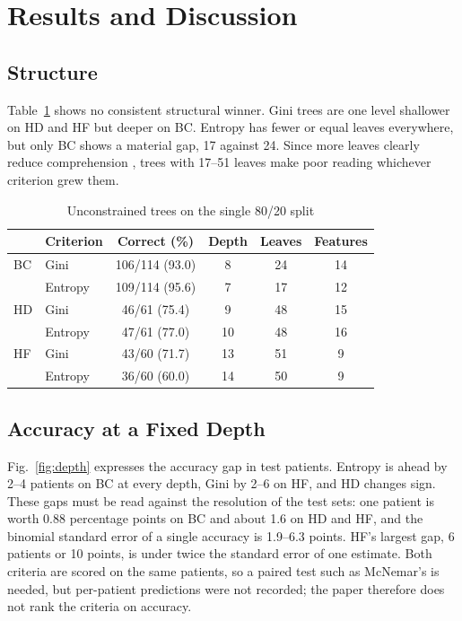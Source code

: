 \documentclass[conference,10pt]{IEEEtran}
\begin{document}
\section{Results and Discussion}
\subsection{Structure}
Table~\ref{tab:struct} shows no consistent structural winner. Gini trees are one level shallower on HD and HF but deeper on BC. Entropy has fewer or equal leaves everywhere, but only BC shows a material gap, 17 against 24. Since more leaves clearly reduce comprehension \cite{piltaver2016}, trees with 17--51 leaves make poor reading whichever criterion grew them.

\begin{table}[!t]
\caption{Unconstrained trees on the single 80/20 split}
\label{tab:struct}
\centering
\footnotesize
\begin{tabular}{@{}l l c c c c@{}}
\hline
 & Criterion & Correct (\%) & Depth & Leaves & Features \\
\hline
BC & Gini & 106/114 (93.0) & 8 & 24 & 14 \\
   & Entropy & 109/114 (95.6) & 7 & 17 & 12 \\
HD & Gini & 46/61 (75.4) & 9 & 48 & 15 \\
   & Entropy & 47/61 (77.0) & 10 & 48 & 16 \\
HF & Gini & 43/60 (71.7) & 13 & 51 & 9 \\
   & Entropy & 36/60 (60.0) & 14 & 50 & 9 \\
\hline
\end{tabular}
\end{table}

\subsection{Accuracy at a Fixed Depth}
Fig.~\ref{fig:depth} expresses the accuracy gap in test patients. Entropy is ahead by 2--4 patients on BC at every depth, Gini by 2--6 on HF, and HD changes sign. These gaps must be read against the resolution of the test sets: one patient is worth 0.88 percentage points on BC and about 1.6 on HD and HF, and the binomial standard error of a single accuracy is 1.9--6.3 points. HF's largest gap, 6 patients or 10 points, is under twice the standard error of one estimate. Both criteria are scored on the same patients, so a paired test such as McNemar's is needed, but per-patient predictions were not recorded; the paper therefore does not rank the criteria on accuracy.
\end{document}
